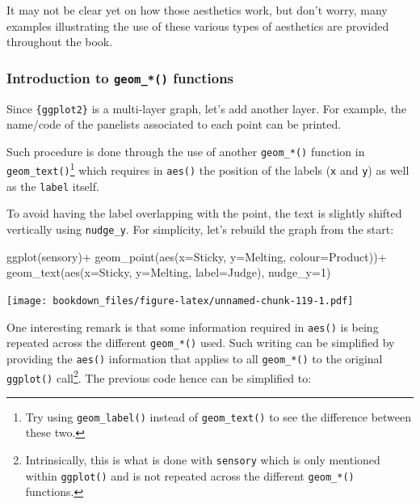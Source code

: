 \documentclass[
]{krantz}
\makeatletter
\newenvironment{Shaded}{\begin{snugshade}}{\end{snugshade}}
\newcommand{\AttributeTok}[1]{\textcolor[rgb]{0.61,0.61,0.61}{#1}}
\newcommand{\DecValTok}[1]{\textcolor[rgb]{0.06,0.06,0.06}{#1}}
\newcommand{\FunctionTok}[1]{\textcolor[rgb]{0,0,0}{#1}}
\newcommand{\NormalTok}[1]{#1}
\newcommand{\SpecialCharTok}[1]{\textcolor[rgb]{0,0,0}{#1}}
\newenvironment{kframe}{%
\medskip{}
\setlength{\fboxsep}{.8em}
 \def\at@end@of@kframe{}%
 \ifinner\ifhmode%
  \def\at@end@of@kframe{\end{minipage}}%
  \begin{minipage}{\columnwidth}%
 \fi\fi%
 \def\FrameCommand##1{\hskip\@totalleftmargin \hskip-\fboxsep
 \colorbox{shadecolor}{##1}\hskip-\fboxsep
     \hskip-\linewidth \hskip-\@totalleftmargin \hskip\columnwidth}%
 \MakeFramed {\advance\hsize-\width
   \@totalleftmargin\z@ \linewidth\hsize
   \@setminipage}}%
 {\par\unskip\endMakeFramed%
 \at@end@of@kframe}
\renewenvironment{Shaded}{\begin{kframe}}{\end{kframe}}
\makeatother
\begin{document}
It may not be clear yet on how those aesthetics work, but don't worry, many examples illustrating the use of these various types of aesthetics are provided throughout the book.

\hypertarget{linechart}{%
\subsubsection{\texorpdfstring{Introduction to \texttt{geom\_*()} functions}{Introduction to geom\_*() functions}}\label{linechart}}

Since \texttt{\{ggplot2\}} is a multi-layer graph, let's add another layer. For example, the name/code of the panelists associated to each point can be printed.

Such procedure is done through the use of another \texttt{geom\_*()} function in \texttt{geom\_text()}\footnote{Try using \texttt{geom\_label()} instead of \texttt{geom\_text()} to see the difference between these two.} which requires in \texttt{aes()} the position of the labels (\texttt{x} and \texttt{y}) as well as the \texttt{label} itself.

To avoid having the label overlapping with the point, the text is slightly shifted vertically using \texttt{nudge\_y}. For simplicity, let's rebuild the graph from the start:

\begin{Shaded}
\begin{Highlighting}[]
\FunctionTok{ggplot}\NormalTok{(sensory)}\SpecialCharTok{+}
  \FunctionTok{geom\_point}\NormalTok{(}\FunctionTok{aes}\NormalTok{(}\AttributeTok{x=}\NormalTok{Sticky, }\AttributeTok{y=}\NormalTok{Melting, }\AttributeTok{colour=}\NormalTok{Product))}\SpecialCharTok{+}
  \FunctionTok{geom\_text}\NormalTok{(}\FunctionTok{aes}\NormalTok{(}\AttributeTok{x=}\NormalTok{Sticky, }\AttributeTok{y=}\NormalTok{Melting, }\AttributeTok{label=}\NormalTok{Judge), }\AttributeTok{nudge\_y=}\DecValTok{1}\NormalTok{)}
\end{Highlighting}
\end{Shaded}

\texttt{[image: bookdown\_files/figure-latex/unnamed-chunk-119-1.pdf]}

One interesting remark is that some information required in \texttt{aes()} is being repeated across the different \texttt{geom\_*()} used. Such writing can be simplified by providing the \texttt{aes()} information that applies to all \texttt{geom\_*()} to the original \texttt{ggplot()} call\footnote{Intrinsically, this is what is done with \texttt{sensory} which is only mentioned within \texttt{ggplot()} and is not repeated across the different \texttt{geom\_*()} functions.}. The previous code hence can be simplified to:
\end{document}
